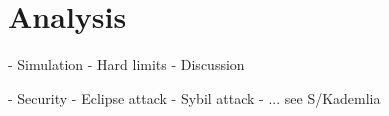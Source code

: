 \chapter{Analysis}
- Simulation
- Hard limits
- Discussion

- Security
    - Eclipse attack
    - Sybil attack
    - ... see S/Kademlia
